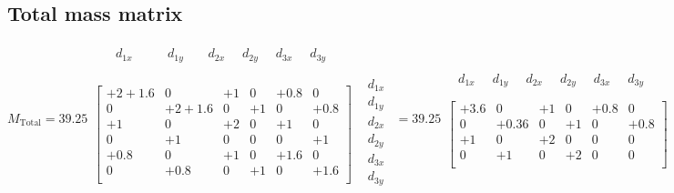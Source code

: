 \documentclass{article}
\begin{document}
\subsection{Total mass matrix}
    \begin{math}
        M_{\text{Total}}=39.25
        \begin{matrix}
            \begin{matrix}
            \;\;\;\;\;d_{1x}&\;\;\;\;\;\;\;d_{1y}& \;\;\;\;d_{2x}&\;\;d_{2y}&\;\;d_{3x}&\;\;d_{3y}\\
            \end{matrix}\\
            \begin{bmatrix}
            +2+1.6& 0    &+1& 0&+0.8& 0  \\
             0    &+2+1.6& 0&+1& 0  &+0.8\\
            +1    & 0    &+2& 0&+1  & 0  \\
             0    &+1    & 0& 0& 0  &+1  \\
            +0.8  & 0    &+1& 0&+1.6& 0  \\
             0    &+0.8  & 0&+1& 0  &+1.6\\
            \end{bmatrix}&
            \begin{matrix}
            d_{1x}\\
            d_{1y}\\
            d_{2x}\\
            d_{2y}\\
            d_{3x}\\
            d_{3y}\\
            \end{matrix}
        \end{matrix}
        =39.25
        \begin{matrix}
            \begin{matrix}
            \;\;d_{1x}&\;\;d_{1y}&\;\;d_{2x}&\;\;d_{2y}&\;\;d_{3x}&\;\;d_{3y}\\
            \end{matrix}\\
            \begin{bmatrix}
            +3.6& 0   &+1& 0&+0.8& 0  \\
             0  &+0.36& 0&+1& 0  &+0.8\\
            +1  & 0   &+2& 0& 0  & 0  \\
             0  &+1   & 0&+2& 0  & 0  \\

\end{bmatrix}
\end{matrix}
\end{math}
\end{document}
